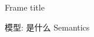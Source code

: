 \documentclass[beamer]{standalone}
\begin{document}
\begin{frame}{Frame title}

  {\rmfamily
	{\tiny 模型: 是什么} Semantics
}
\end{frame}
\end{document}
